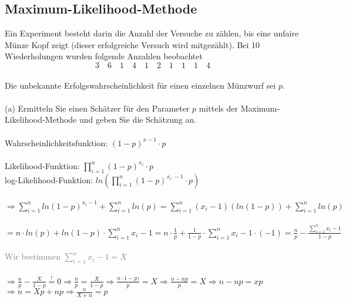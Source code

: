 \documentclass[a4paper]{article}
\begin{document}
\subsection{Maximum-Likelihood-Methode}
Ein Experiment besteht darin die Anzahl der Versuche zu zählen, bis eine unfaire Münze Kopf zeigt (dieser erfolgreiche Versuch wird mitgezählt). Bei 10 Wiederholungen wurden folgende Anzahlen beobachtet\\
\[3\quad 6\quad 1\quad 4\quad 1\quad 2\quad 1\quad 1\quad 1\quad 4\]\\
Die unbekannte Erfolgswahrscheinlichkeit für einen einzelnen Münzwurf sei $p$.\\\\
(a) Ermitteln Sie einen Schätzer für den Parameter $p$ mittels der Maximum-Likelihood-Methode und geben Sie die Schätzung an.\\\\
Wahrscheinlichkeitsfunktion: \((1-p)^{x-1}\cdot p\)\\\\
Likelihood-Funktion: \(\prod\limits^n_{i=1}(1-p)^{x_i}\cdot p\)\\
log-Likelihood-Funktion: \(ln\left(\prod\limits^n_{i=1}(1-p)^{x_i.-1}\cdot p\right)\)\\\\
\hspace*{3,53cm}\(\Rightarrow \sum\limits^n_{i=1} ln(1-p)^{x_i-1}+\sum\limits^n_{i=1}ln(p) = \sum\limits^n_{i=1}(x_i-1)(ln(1-p))+\sum\limits^n_{i=1}ln(p)\)\\\\
\hspace*{3,57cm}\(=n \cdot ln(p)+ln(1-p)\cdot \sum\limits^n_{i=1}x_i-1 = n \cdot \frac{1}{p}+\frac{1}{1-p}\cdot \sum\limits^n_{i=1}x_i-1 \cdot (-1)=\frac{n}{p}-\frac{\sum\limits^n_{i=1}x_i-1}{1-p}\)\\\\
\hspace*{3,57cm}\textcolor{gray}{Wir bestimmen $\sum\limits^n_{i=1}x_i-1 = X$}\\\\
\hspace*{3,53cm}\(\Rightarrow \frac{n}{p} - \frac{X}{1-p} \overset{!}{=} 0 \Rightarrow \frac{n}{p} = \frac{X}{1-p} \Rightarrow \frac{n\cdot 1-p)}{p} = X \Rightarrow \frac{n-np}{p}=X \Rightarrow n-np = xp\)\\
\hspace*{3,53cm}\(\Rightarrow n = Xp + np \Rightarrow \frac{n}{X+n} = p\)\\\\
\end{document}
